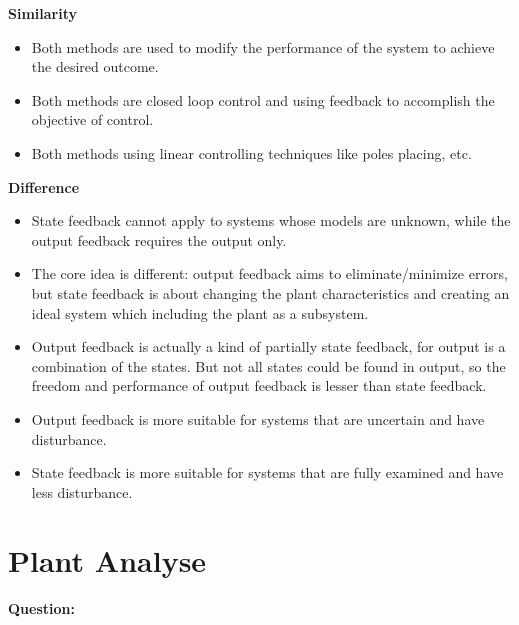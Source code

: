 \documentclass[12pt, oneside]{article}
\begin{document}
\textbf{Similarity}
\begin{itemize}
    \item Both methods are used to modify the performance of the system to achieve the desired outcome.
    \item Both methods are closed loop control and using feedback to accomplish the objective of control.
    \item Both methods using linear controlling techniques like poles placing, etc.
\end{itemize}

\textbf{Difference}
\begin{itemize}
    \item State feedback cannot apply to systems whose models are unknown, while the output feedback requires the output only.
    \item The core idea is different: output feedback aims to eliminate/minimize errors, but state feedback is about changing the plant characteristics and creating an ideal system which including the plant as a subsystem.
    \item Output feedback is actually a kind of partially state feedback, for output is a combination of the states. But not all states could be found in output, so the freedom and performance of output feedback is lesser than state feedback.
    \item Output feedback is more suitable for systems that are uncertain and have disturbance.
    \item State feedback is more suitable for systems that are fully examined and have less disturbance.
\end{itemize}



\section{Plant Analyse}
\label{section:plant analyse}
\textbf{Question:}
\end{document}
